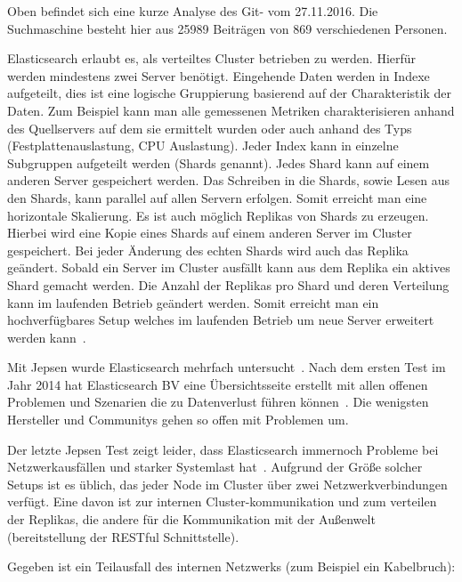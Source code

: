 

Oben befindet sich eine kurze Analyse des \gls{Git}-
 vom 27.11.2016. Die Suchmaschine besteht
hier aus 25989 Beiträgen von 869 verschiedenen Personen.

Elasticsearch erlaubt es, als verteiltes Cluster betrieben zu werden. Hierfür
werden mindestens zwei Server benötigt. Eingehende Daten werden in Indexe
aufgeteilt, dies ist eine logische Gruppierung basierend auf der Charakteristik
der Daten. Zum Beispiel kann man alle gemessenen Metriken charakterisieren
anhand des Quellservers auf dem sie ermittelt wurden oder auch anhand des Typs
(Festplattenauslastung, CPU Auslastung). Jeder Index kann in einzelne
Subgruppen aufgeteilt werden (Shards genannt). Jedes Shard kann auf einem
anderen Server gespeichert werden. Das Schreiben in die Shards, sowie Lesen aus
den Shards, kann parallel auf allen Servern erfolgen. Somit erreicht man eine
horizontale \gls{Skalierung}. Es ist auch möglich Replikas von Shards zu
erzeugen. Hierbei wird eine Kopie eines Shards auf einem anderen Server im
Cluster gespeichert. Bei jeder Änderung des echten Shards wird auch das Replika
geändert. Sobald ein Server im Cluster ausfällt kann aus dem Replika ein
aktives Shard gemacht werden. Die Anzahl der Replikas pro Shard und deren
Verteilung kann im laufenden Betrieb geändert werden. Somit erreicht man ein
hochverfügbares Setup welches im laufenden Betrieb um neue Server erweitert
werden kann~\cite{es_concepts}.

Mit \gls{Jepsen} wurde Elasticsearch mehrfach untersucht~\cite{es_jepsen_all}.
Nach dem ersten Test im Jahr 2014 hat Elasticsearch BV eine Übersichtsseite
erstellt mit allen offenen Problemen und Szenarien die zu Datenverlust führen
können~\cite{es_resiliency}. Die wenigsten Hersteller und Communitys gehen so
offen mit Problemen um.

Der letzte Jepsen Test zeigt leider, dass Elasticsearch immernoch Probleme bei
Netzwerkausfällen und starker Systemlast hat~\cite{jepsen_elastic}. Aufgrund
der Größe solcher Setups ist es üblich, das jeder Node im Cluster über zwei
Netzwerkverbindungen verfügt. Eine davon ist zur internen Cluster-kommunikation
und zum verteilen der Replikas, die andere für die Kommunikation mit der
Außenwelt (bereitstellung der RESTful Schnittstelle).

Gegeben ist ein Teilausfall des internen Netzwerks (zum Beispiel ein
Kabelbruch):

